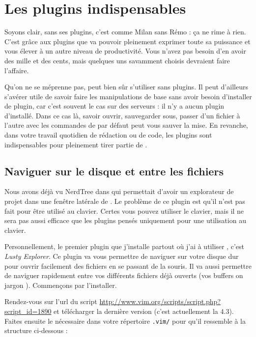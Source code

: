 \chapter{Les plugins indispensables}

Soyons clair, \vim sans ses plugins, c'est comme Milan sans Rémo : ça ne rime à rien. C'est grâce aux plugins que \vim va pouvoir pleinement exprimer toute sa puissance et vous élever à un autre niveau de productivité. Vous n'avez pas besoin d'en avoir des mille et des cents, mais quelques uns savamment choisis devraient faire l'affaire.

Qu'on ne se méprenne pas, \vim peut bien sûr s'utiliser sans plugins. Il peut d'ailleurs s'avérer utile de savoir faire les manipulations de base sans avoir besoin d'installer de plugin, car c'est souvent le cas sur des serveurs : il n'y a aucun plugin d'installé. Dans ce cas là, savoir ouvrir, sauvegarder sous, passer d'un fichier à l'autre avec les commandes de \vim par défaut peut vous sauver la mise. En revanche, dans votre travail quotidien de rédaction ou de code, les plugins sont indispensables pour pleinement tirer partie de \vim.

\section{Naviguer sur le disque et entre les fichiers}


Nous avons déjà vu NerdTree dans  qui permettait d'avoir un explorateur de projet dans une fenêtre latérale de \vim. Le problème de ce plugin est qu'il n'est pas fait pour être utilisé au clavier. Certes vous pouvez utiliser le clavier, mais il ne sera pas aussi efficace que les plugins pensés uniquement pour une utilisation au clavier.

Personnellement, le premier plugin que j'installe partout où j'ai à utiliser \vim, c'est \emph{Lusty Explorer}. Ce plugin va vous permettre de naviguer sur votre disque dur pour ouvrir facilement des fichiers en se passant de la souris. Il va aussi permettre de naviguer rapidement entre vos différents fichiers déjà ouverts (vos buffers on jargon \vim). Commençons par l'installer.

Rendez-vous sur l'url du script \url{http://www.vim.org/scripts/script.php?script\_id=1890} et télécharger la dernière version (c'est actuellement la 4.3). Faites ensuite le nécessaire dans votre répertoire \Verb|.vim/| pour qu'il ressemble à la structure ci-dessous :

